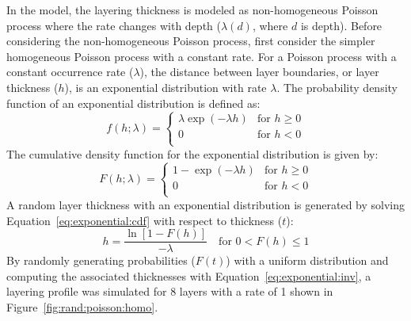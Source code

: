 \documentclass[12pt,oneside]{book}
\begin{document}
In the \citet{toro:95} model, the layering thickness is modeled as non-homogeneous Poisson process
where the rate changes with depth ($\lambda(d)$, where $d$ is depth).  Before considering the
non-homogeneous Poisson process, first consider the simpler homogeneous Poisson process with a
constant rate.  For a Poisson process with a constant occurrence rate ($\lambda$), the distance
between layer boundaries, or layer thickness ($h$), is an exponential distribution with rate
$\lambda$.  The probability density function of an exponential distribution is defined as:
\begin{equation}
    f(h;\lambda) = 
    \left\{
        \begin{array}{ll}
            \lambda \exp(-\lambda h) & \text{for } h \ge 0 \\
            0 & \text{for } h < 0 \\
        \end{array}
    \right.
    \label{eq:exponential:pdf}
\end{equation}
The cumulative density function for the exponential distribution is given by:
\begin{equation}
    F(h;\lambda) = 
    \left\{
        \begin{array}{ll}
            1- \exp(-\lambda h) & \text{for } h \ge 0 \\
            0 & \text{for } h < 0 \\
        \end{array}
    \right.
    \label{eq:exponential:cdf}
\end{equation}
A random layer thickness with an exponential distribution is generated by solving
Equation~\ref{eq:exponential:cdf} with respect to thickness ($t$):
\begin{equation}
    h = \frac{\ln\left[1-F(h)\right]}{-\lambda} \quad \text{for } 0 < F(h) \le 1
    \label{eq:exponential:inv}
\end{equation}
By randomly generating probabilities ($F(t)$) with a uniform distribution and computing the
associated thicknesses with Equation~\ref{eq:exponential:inv}, a layering profile was simulated for
8 layers with a rate of 1 shown in Figure~\ref{fig:rand:poisson:homo}.
\end{document}
